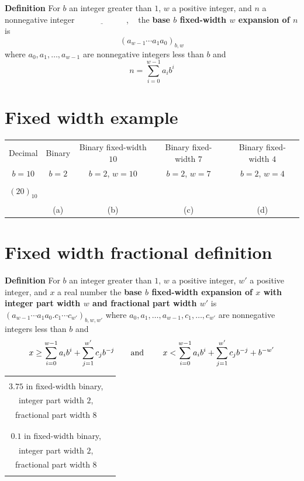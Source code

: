 \documentclass[12pt, oneside]{article}
\begin{document}
{\bf Definition} For $b$ an integer greater than $1$, $w$ a positive integer, 
and $n$ a nonnegative integer
$\underline{\phantom{\hspace{1in}}}$, ~
the {\bf base $b$ fixed-width $w$ expansion of $n$}  is
\[
(a_{w-1} \cdots a_1 a_0)_{b,w}
\]
where  $a_0, a_1, \ldots, a_{w-1}$ are nonnegative integers less than $b$ and
\[
n =  \sum_{i=0}^{w-1} a_{i} b^{i}
\]
 \vfill
\section*{Fixed width example}


\begin{center}
    \begin{tabular}{|c|c|c|c|c|}
    \hline
    Decimal &  Binary  & Binary fixed-width $10$& Binary fixed-width $7$ & Binary fixed-width $4$\\
    $b=10$ & $b=2$ & $b=2$, $w =  10$& $b=2$, $w =  7$& $b=2$, $w =  4$ \\
    \hline 
    &&&&  \\
    $(20)_{10}$&\phantom{$(10100)_{2}$\qquad\qquad}&&  &\\
    &&&&  \\
    &(a)&(b)&(c)&(d)  \\
    \hline
    \end{tabular}
    \end{center}
 \vfill
\section*{Fixed width fractional definition}


{\bf Definition} For $b$ an integer greater than $1$, $w$ a positive integer, 
$w'$ a positive  integer, and $x$ a real number the {\bf base $b$ fixed-width 
expansion of $x$ with integer part width $w$  and fractional part width $w'$} is
$(a_{w-1} \cdots a_1 a_0 .  c_{1} \cdots c_{w'})_{b,w,w'}$
where  $a_0, a_1, \ldots, a_{w-1}, c_1, \ldots, c_{w'}$ are nonnegative integers less than $b$ and
$$x \geq \sum_{i=0}^{w-1} a_{i} b^{i} + \sum_{j=1}^{w'}  c_{j} b^{-j} \hfill
\textrm{\qquad and \qquad}
\hfill x < \sum_{i=0}^{w-1} a_{i} b^{i} + \sum_{j=1}^{w'} c_{j} b^{-j} + b^{-w'}$$

\begin{center}
\begin{tabular}{|c|p{5in}|}
\hline
& \\
$3.75$  in fixed-width binary,& \\
integer part width $2$,&\\
 fractional part width $8$ & \\
& \\
\hline
& \\
$0.1$  in fixed-width binary, & \\
integer part width $2$, &\\
 fractional part width $8$ & \\
& \\
\hline
\end{tabular}
\end{center}
\end{document}
